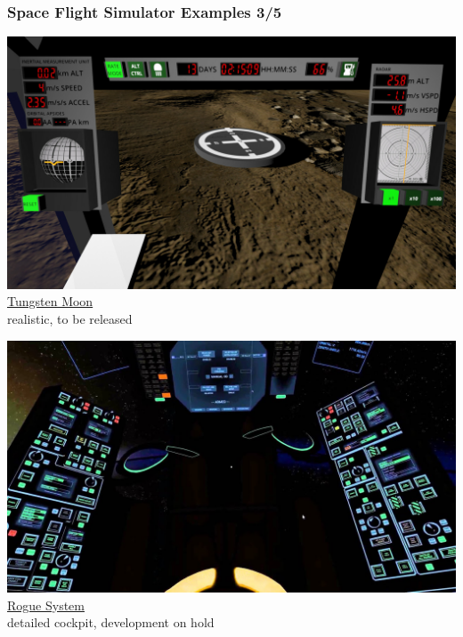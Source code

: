 \documentclass[aspectratio=169,11pt,xcolor=dvipsnames]{beamer}
\begin{document}
\begin{frame}
  \frametitle{Space Flight Simulator Examples 3/5}
  \begin{minipage}[t]{0.49\textwidth}
    \begin{center}
      \includegraphics[width=\textwidth]{tungsten-moon}\\
      \href{https://tungstenmoon.com/}{Tungsten Moon}\\
      realistic, to be released
    \end{center}
  \end{minipage}
  \begin{minipage}[t]{0.49\textwidth}
    \begin{center}
      \includegraphics[width=\textwidth]{rogue-system}\\
      \href{https://imagespaceinc.com/rogsys/}{Rogue System}\\
      detailed cockpit, development on hold
    \end{center}
  \end{minipage}
\end{frame}
\end{document}
